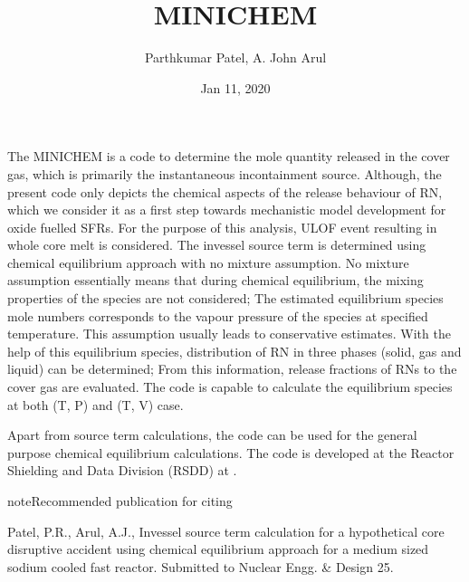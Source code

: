 \documentclass[letterpaper,10pt,english]{sphinxmanual}
\title{MINICHEM}
\date{Jan 11, 2020}
\author{Parthkumar Patel, A.\@{} John Arul}
\begin{document}
\pagestyle{empty}
\sphinxmaketitle
\pagestyle{plain}
\sphinxtableofcontents
\pagestyle{normal}
\label{\detokenize{index::doc}}


The MINICHEM is a code to determine the mole quantity released in the cover
gas, which is primarily the instantaneous in\sphinxhyphen{}containment source. Although, the
present code only depicts the chemical aspects of the release behaviour of RN,
which we consider it as a first step towards mechanistic model development for
oxide fuelled SFRs. For the purpose of this analysis, ULOF event resulting in
whole core melt is considered.
The in\sphinxhyphen{}vessel source term is determined using chemical equilibrium approach
with no mixture assumption. No mixture assumption essentially means that
during chemical equilibrium, the mixing properties of the species are not
considered; The estimated equilibrium species mole numbers corresponds to
the vapour pressure of the species at specified temperature. This assumption
usually leads to conservative estimates. With the help of this equilibrium
species, distribution of RN in three phases (solid, gas and liquid) can be
determined; From this information, release fractions of RNs to the cover gas
are evaluated. The code is capable to calculate the equilibrium species at both (T, P) and (T, V) case.

Apart from source term calculations, the code can be used for the
general purpose chemical equilibrium calculations. The
code is developed at the Reactor Shielding and Data Division (RSDD) at .

\begin{sphinxadmonition}{note}{Recommended publication for citing}

Patel, P.R., Arul, A.J., In\sphinxhyphen{}vessel source term calculation for a hypothetical core disruptive accident using chemical equilibrium approach for a medium sized sodium cooled fast reactor. Submitted to Nuclear Engg. \& Design 25.
\end{sphinxadmonition}
\end{document}
